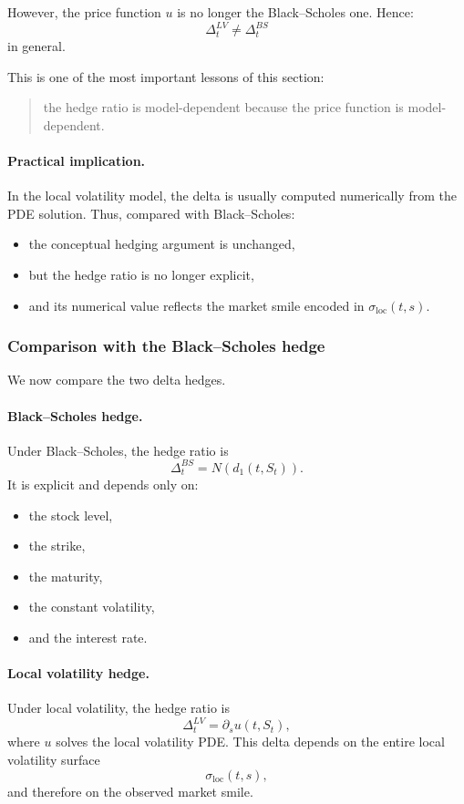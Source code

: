 \documentclass[11pt]{article}
\theoremstyle{plain}
\theoremstyle{definition}
\theoremstyle{remark}
\begin{document}
However, the price function \(u\) is no longer the Black--Scholes one.
Hence:
\[
\Delta_t^{LV}\neq \Delta_t^{BS}
\]
in general.

This is one of the most important lessons of this section:
\begin{quote}
the hedge ratio is model-dependent because the price function is
model-dependent.
\end{quote}

\paragraph{Practical implication.}
In the local volatility model, the delta is usually computed numerically
from the PDE solution.
Thus, compared with Black--Scholes:
\begin{itemize}[leftmargin=1.4em]
    \item the conceptual hedging argument is unchanged,
    \item but the hedge ratio is no longer explicit,
    \item and its numerical value reflects the market smile encoded in
    \(\sigma_{\mathrm{loc}}(t,s)\).
\end{itemize}

\subsubsection{Comparison with the Black--Scholes hedge}

We now compare the two delta hedges.

\paragraph{Black--Scholes hedge.}
Under Black--Scholes, the hedge ratio is
\[
\Delta_t^{BS}=N(d_1(t,S_t)).
\]
It is explicit and depends only on:
\begin{itemize}[leftmargin=1.4em]
    \item the stock level,
    \item the strike,
    \item the maturity,
    \item the constant volatility,
    \item and the interest rate.
\end{itemize}

\paragraph{Local volatility hedge.}
Under local volatility, the hedge ratio is
\[
\Delta_t^{LV}=\partial_s u(t,S_t),
\]
where \(u\) solves the local volatility PDE.
This delta depends on the entire local volatility surface
\[
\sigma_{\mathrm{loc}}(t,s),
\]
and therefore on the observed market smile.
\end{document}
